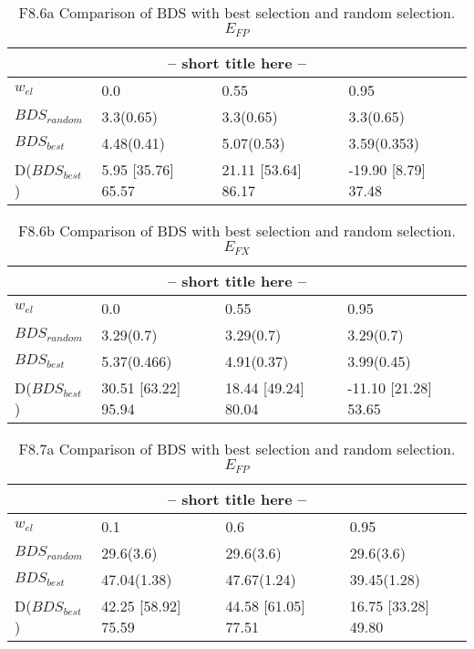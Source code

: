\clearpage
\begin{landscape}
\begin{table}[h]
\label{at:xx}
\begin{center}
\begin{tabular}{llll}
\toprule
\multicolumn{4}{c}{-- short title here --}\\
\midrule
$w_{el}$ & 0.0 & 0.55 & 0.95\\
\midrule
$BDS_{random}$ & 3.3(0.65) & 3.3(0.65) & 3.3(0.65)\\
\midrule
$BDS_{best}$ & 4.48(0.41) & 5.07(0.53) & 3.59(0.353)\\
D($BDS_{best}$) & 5.95 [35.76] 65.57 & 21.11 [53.64] 86.17 & -19.90 [8.79] 37.48\\
\bottomrule
\end{tabular}
\end{center}
\caption{F8.6a Comparison of BDS with best selection and random selection. $E_{FP}$}
\end{table}
\end{landscape}


\clearpage
\begin{landscape}
\begin{table}[h]
\label{at:xx}
\begin{center}
\begin{tabular}{llll}
\toprule
\multicolumn{4}{c}{-- short title here --}\\
\midrule
$w_{el}$ & 0.0 & 0.55 & 0.95\\
\midrule
$BDS_{random}$ & 3.29(0.7) & 3.29(0.7) & 3.29(0.7)\\
\midrule
$BDS_{best}$ & 5.37(0.466) & 4.91(0.37) & 3.99(0.45)\\
D($BDS_{best}$) & 30.51 [63.22] 95.94 & 18.44 [49.24] 80.04 & -11.10 [21.28] 53.65\\
\bottomrule
\end{tabular}
\end{center}
\caption{F8.6b Comparison of BDS with best selection and random selection. $E_{FX}$}
\end{table}
\end{landscape}


\clearpage
\begin{landscape}
\begin{table}[h]
\label{at:xx}
\begin{center}
\begin{tabular}{llll}
\toprule
\multicolumn{4}{c}{-- short title here --}\\
\midrule
$w_{el}$ & 0.1 & 0.6 & 0.95\\
\midrule
$BDS_{random}$ & 29.6(3.6) & 29.6(3.6) & 29.6(3.6)\\
\midrule
$BDS_{best}$ & 47.04(1.38) & 47.67(1.24) & 39.45(1.28)\\
D($BDS_{best}$) & 42.25 [58.92] 75.59 & 44.58 [61.05] 77.51 & 16.75 [33.28] 49.80\\
\bottomrule
\end{tabular}
\end{center}
\caption{F8.7a Comparison of BDS with best selection and random selection. $E_{FP}$}
\end{table}
\end{landscape}


